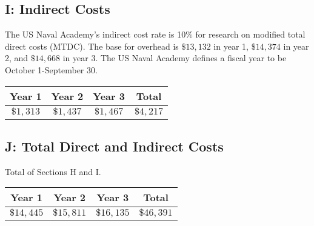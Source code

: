 \documentclass[11pt]{article}
\begin{document}
\subsection*{I: Indirect Costs}
The US Naval Academy's indirect cost rate is 10\% for research on
modified total direct costs (MTDC).  The base for overhead is
$\$13,132$ in year 1, $\$14,374$ in year 2, and $\$14,668$ in
year 3.  The US Naval Academy defines a fiscal year to be October 1-September
30.
\begin{center}
  \begin{tabular}{|c|c|c|c|}
    \hline
    Year 1 & Year 2 & Year 3 & Total \\
    \hline
    $\$1,313$ & $\$1,437$ & $\$1,467$ & $\$4,217$ \\
    \hline
  \end{tabular}
\end{center}


\subsection*{J: Total Direct and Indirect Costs}
Total of Sections H and I.
\begin{center}
  \begin{tabular}{|c|c|c|c|}
    \hline
    Year 1 & Year 2 & Year 3 & Total \\
    \hline
    $\$14,445$ & $\$15,811$ & $\$16,135$ & $\$46,391$ \\
    \hline
  \end{tabular}
\end{center}
\end{document}

